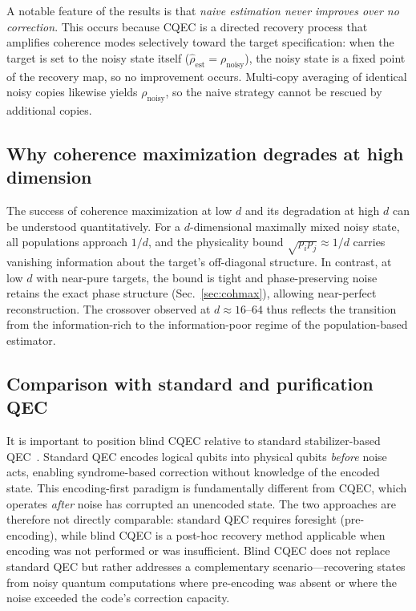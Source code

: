 \documentclass[prx,twocolumn,superscriptaddress,longbibliography,floatfix]{revtex4-2}
\newcommand{\rhon}{\rho_\mathrm{noisy}}
\newcommand{\rhoe}{\hat{\rho}_\mathrm{est}}
\begin{document}
A notable feature of the results is that \emph{naive estimation never improves over no correction}.
This occurs because CQEC is a directed recovery process that amplifies coherence modes selectively toward the target specification: when the target is set to the noisy state itself ($\rhoe = \rhon$), the noisy state is a fixed point of the recovery map, so no improvement occurs.
Multi-copy averaging of identical noisy copies likewise yields $\rhon$, so the naive strategy cannot be rescued by additional copies.


\subsection{Why coherence maximization degrades at high dimension}
\label{sec:cohmax_principle}

The success of coherence maximization at low $d$ and its degradation at high $d$ can be understood quantitatively.
For a $d$-dimensional maximally mixed noisy state, all populations approach $1/d$, and the physicality bound $\sqrt{p_i p_j} \approx 1/d$ carries vanishing information about the target's off-diagonal structure.
In contrast, at low $d$ with near-pure targets, the bound is tight and phase-preserving noise retains the exact phase structure (Sec.~\ref{sec:cohmax}), allowing near-perfect reconstruction.
The crossover observed at $d \approx 16$--$64$ thus reflects the transition from the information-rich to the information-poor regime of the population-based estimator.


\subsection{Comparison with standard and purification QEC}
\label{sec:pqec}

It is important to position blind CQEC relative to standard stabilizer-based QEC~\cite{Shor1995,Gottesman1997}.
Standard QEC encodes logical qubits into physical qubits \emph{before} noise acts, enabling syndrome-based correction without knowledge of the encoded state.
This encoding-first paradigm is fundamentally different from CQEC, which operates \emph{after} noise has corrupted an unencoded state.
The two approaches are therefore not directly comparable: standard QEC requires foresight (pre-encoding), while blind CQEC is a post-hoc recovery method applicable when encoding was not performed or was insufficient.
Blind CQEC does not replace standard QEC but rather addresses a complementary scenario---recovering states from noisy quantum computations where pre-encoding was absent or where the noise exceeded the code's correction capacity.
\end{document}
